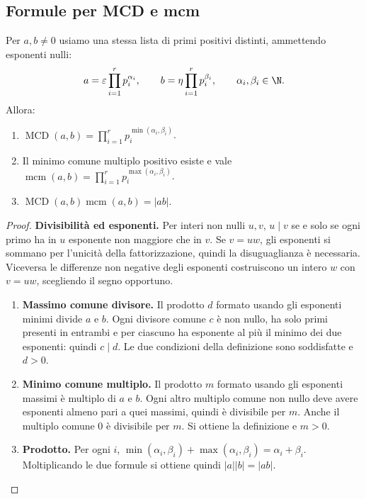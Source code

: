 \subsection{Formule per MCD e mcm}
\begin{proposizione}\label{prop:mcd-mcm}
Per $a,b\ne0$ usiamo una stessa lista di primi positivi distinti, ammettendo esponenti nulli:
\[
a=\varepsilon\prod_{i=1}^r p_i^{\alpha_i},\qquad
b=\eta\prod_{i=1}^r p_i^{\beta_i},\qquad \alpha_i,\beta_i\in\N.
\]
Allora:
\begin{enumerate}[label=\arabic*.]
\item $\displaystyle\operatorname{MCD}(a,b)=\prod_{i=1}^r p_i^{\min(\alpha_i,\beta_i)}$.
\item Il minimo comune multiplo positivo esiste e vale $\displaystyle\operatorname{mcm}(a,b)=\prod_{i=1}^r p_i^{\max(\alpha_i,\beta_i)}$.
\item $\operatorname{MCD}(a,b)\operatorname{mcm}(a,b)=|ab|$.
\end{enumerate}
\end{proposizione}
\begin{proof}
\textbf{Divisibilità ed esponenti.} Per interi non nulli $u,v$, $u\mid v$ se e solo se ogni primo ha in $u$ esponente non maggiore che in $v$. Se $v=uw$, gli esponenti si sommano per l'unicità della fattorizzazione, quindi la disuguaglianza è necessaria. Viceversa le differenze non negative degli esponenti costruiscono un intero $w$ con $v=uw$, scegliendo il segno opportuno.

\begin{enumerate}[label=\arabic*.]
\item \textbf{Massimo comune divisore.} Il prodotto $d$ formato usando gli esponenti minimi divide $a$ e $b$. Ogni divisore comune $c$ è non nullo, ha solo primi presenti in entrambi e per ciascuno ha esponente al più il minimo dei due esponenti: quindi $c\mid d$. Le due condizioni della definizione sono soddisfatte e $d>0$.
\item \textbf{Minimo comune multiplo.} Il prodotto $m$ formato usando gli esponenti massimi è multiplo di $a$ e $b$. Ogni altro multiplo comune non nullo deve avere esponenti almeno pari a quei massimi, quindi è divisibile per $m$. Anche il multiplo comune $0$ è divisibile per $m$. Si ottiene la definizione e $m>0$.
\item \textbf{Prodotto.} Per ogni $i$, $\min(\alpha_i,\beta_i)+\max(\alpha_i,\beta_i)=\alpha_i+\beta_i$. Moltiplicando le due formule si ottiene quindi $|a||b|=|ab|$.
\end{enumerate}
\end{proof}

